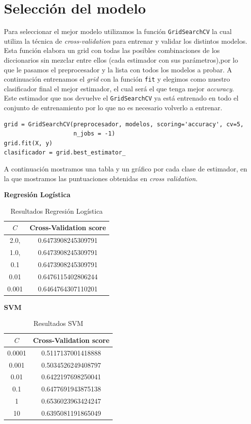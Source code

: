 \documentclass[size=a4, parskip=half, titlepage=false, toc=flat, toc=bib, 12pt]{scrartcl}
\begin{document}
\section{Selección del modelo}
Para seleccionar el mejor modelo utilizamos la función \verb|GridSearchCV| la cual utiliza la técnica de \textit{cross-validation} para entrenar y validar los distintos modelos. Esta función elabora un grid con todas las posibles combinaciones de los diccionarios sin mezclar entre ellos (cada estimador con sus parámetros),por lo que le pasamos el preprocesador y la lista con todos los modelos a probar. A continuación entrenamos el \textit{grid} con la función \verb|fit| y elegimos como nuestro clasificador final el mejor estimador, el cual será el que tenga mejor \textit{accuracy}. Este estimador que nos devuelve el \verb|GridSearchCV| ya está entrenado en todo el conjunto de entrenamiento por lo que no es necesario volverlo a entrenar.
\begin{verbatim}
grid = GridSearchCV(preprocesador, modelos, scoring='accuracy', cv=5,
                    n_jobs = -1)
grid.fit(X, y)
clasificador = grid.best_estimator_
\end{verbatim}

A continuación mostramos una tabla y un gráfico por cada clase de estimador, en la que mostramos las puntuaciones obtenidas en \textit{cross validation}.

\textbf{Regresión Logística}

\begin{table}[ht]
    \centering
    \caption{Resultados Regresión Logística}
    \label{tab:results-plapocket}
    \begin{tabular}{c | c  }
 \(C\) & Cross-Validation score \\
 \hline
 2.0,   & 0.6473908245309791  \\
 1.0,   & 0.6473908245309791  \\
 0.1   & 0.6473908245309791  \\
 0.01   & 0.6476115402806244 \\
 0.001  & 0.6464764307110201

    \end{tabular}
\end{table}

\textbf{SVM}

\begin{table}[ht]
    \centering
    \caption{Resultados SVM}
    \label{tab:results-plapocket}
    \begin{tabular}{c | c  }
 \(C\) & Cross-Validation score \\
 \hline
 0.0001 & 0.5117137001418888  \\
 0.001  & 0.5034526249408797  \\
 0.01   & 0.6422197698250041  \\
 0.1    & 0.6477691943875138 \\
 1      & 0.6536023963424247 \\
 10     & 0.6395081191865049
    \end{tabular}
\end{table}
\end{document}
